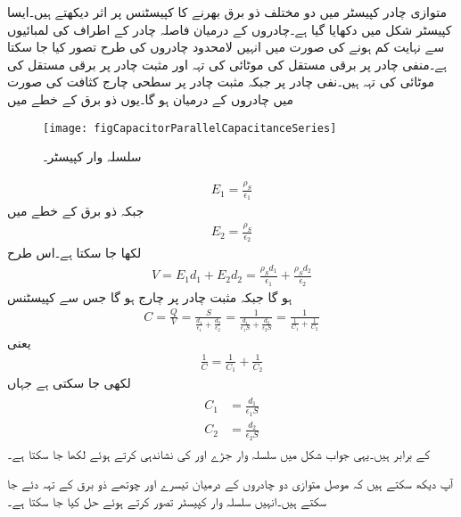 متوازی چادر کپیسٹر میں دو مختلف ذو برق بھرنے کا کپیسٹنس پر اثر دیکھتے ہیں۔ایسا کپیسٹر شکل  میں دکھایا گیا ہے۔چادروں کے درمیان فاصلہ چادر کے اطراف کی لمبائیوں سے نہایت کم ہونے کی صورت میں انہیں لامحدود چادروں کی طرح تصور کیا جا سکتا ہے۔منفی چادر پر  برقی مستقل کی  موٹائی کی تہہ  اور مثبت چادر پر  برقی مستقل کی  موٹائی کی تہہ ہیں۔نفی چادر پر  جبکہ مثبت چادر پر  سطحی چارج کثافت کی صورت میں چادروں کے درمیان  ہو گا۔یوں  ذو برق کے خطے میں
\begin{figure}[!ht]
\centering
\texttt{[image: figCapacitorParallelCapacitanceSeries]}
\caption{سلسلہ وار کپیسٹر۔}
\label{شکل_کپیسٹر_سلسلہ_وار}
\end{figure}
%
\begin{align*}
E_1=\frac{\rho_S}{\epsilon_1}
\end{align*}
جبکہ  ذو برق کے خطے میں
\begin{align*}
E_2=\frac{\rho_S}{\epsilon_2}
\end{align*}
لکھا جا سکتا ہے۔اس طرح 
\begin{align*}
V=E_1 d_1+E_2 d_2=\frac{\rho_S d_1}{\epsilon_1}+\frac{\rho_S d_2}{\epsilon_2}
\end{align*}
ہو گا جبکہ مثبت چادر پر چارج  ہو گا جس سے کپیسٹنس
\begin{align*}
C=\frac{Q}{V}=\frac{S}{\frac{d_1}{\epsilon_1}+\frac{d_2}{\epsilon_2}}=\frac{1}{\frac{d_1}{\epsilon_1 S }+\frac{d_2}{\epsilon_2 S }}=\frac{1}{\frac{1}{C_1}+\frac{1}{C_2}}
\end{align*}
یعنی
\begin{align}
\frac{1}{C}=\frac{1}{C_1}+\frac{1}{C_2}
\end{align}
لکھی جا سکتی ہے جہاں
\begin{gather}
\begin{aligned}
C_1&=\frac{d_1}{\epsilon_1 S}\\
C_2&=\frac{d_2}{\epsilon_2 S}
\end{aligned}
\end{gather}
کے برابر ہیں۔یہی جواب شکل  میں سلسلہ وار جڑے   اور  کی نشاندہی کرتے ہوئے لکھا جا سکتا ہے۔

آپ دیکھ سکتے ہیں کہ موصل متوازی دو چادروں کے درمیان تیسرے اور چوتھے ذو برق کے تہہ دئے جا سکتے ہیں۔انہیں سلسلہ وار کپیسٹر تصور کرتے ہوئے حل کیا جا سکتا ہے۔

